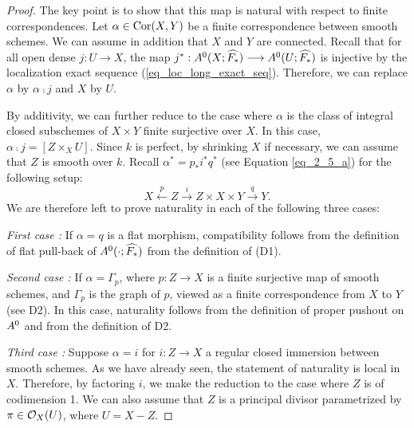 \begin{proof}
The key point is to show that this map is natural with respect to
finite correspondences. Let $\alpha \in \mathrm{Cor}(X, Y)$ be a finite 
correspondence between smooth schemes. We can assume in addition 
that $X$ and $Y$ are connected. Recall that for all open dense 
$j: U \to X$, the map $j^* : A^0(X; \widehat{F_*}) \longrightarrow 
A^0(U; \widehat{F_*})$ is injective by the localization 
exact sequence (\ref{eq_loc_long_exact_seq}). Therefore, we can 
replace $\alpha$ by $\alpha \comp j$ and $X$ by $U$.

By additivity, we can further reduce to the case where $\alpha$ is
the class of integral closed subschemes of $X \times Y$ finite 
surjective over $X$. In this case, $\alpha \comp j = [Z \times_X 
U].$ Since $k$ is perfect, by shrinking $X$ if necessary, we can
assume that $Z$ is smooth over $k$. Recall $\alpha^* = p_*i^*q^*$ 
(see Equation \ref{eq_2_5_a}) for the following setup:
\[
X \stackrel{p}{\longleftarrow} Z \stackrel{i}{\rightarrow} 
   Z \times X \times Y \stackrel{q}{\rightarrow} Y.
\]
We are therefore left to prove naturality in each of the following
three cases:

\emph{First case : } If $\alpha = q$ is a flat morphism, 
compatibility follows from the definition of flat pull-back of
$A^0(\cdot; \widehat{F_*})$ from the definition of (D1).

\emph{Second case : } If $\alpha = \Gamma_p$, where $p : Z \to X$
is a finite surjective map of smooth schemes, and $\Gamma_p$ is
the graph of $p$, viewed as a finite correspondence from $X$ to 
$Y$ (see D2). In this case, naturality follows from the definition 
of proper pushout on $A^0$ and from the definition of D2.

\emph{Third case : } Suppose $\alpha = i$ for $i: Z \to X$ a
regular closed immersion between smooth schemes. As we have 
already seen, the statement of naturality is local in $X$. 
Therefore, by factoring $i$, we make the reduction to the case
where $Z$ is of codimension 1. We can also assume that $Z$ is a
principal divisor parametrized by $\pi \in \mathcal{O}_X(U)$, where $U =
X - Z$.


\end{proof}
